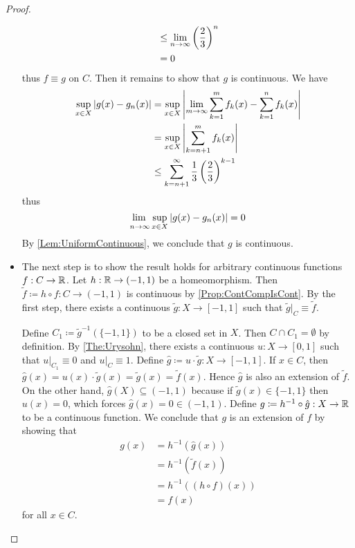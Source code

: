 \documentclass[screen]{techreport}
\numberwithin{equation}{section}
\begin{document}
\begin{proof}
\begin{itemize}
\begin{align*}
			& \le \lim_{n \to \infty} \left({\frac{2}{3}}\right)^n \\
			& = 0
		\end{align*}
		thus $f \equiv g$ on $C$.
		Then it remains to show that $g$ is continuous.
		We have
		\begin{align*}
			\sup_{x \in X} \left|{ g(x) - g_n(x) }\right| & = \sup_{x \in X} \left|{ \lim_{m \to \infty} \sum_{k=1}^m f_k(x) - \sum_{k=1}^n f_k(x) }\right| \\
			& = \sup_{x \in X} \left|{ \sum_{k=n+1}^m f_k(x) }\right| \\
			& \le \sum_{k=n+1}^\infty \frac{1}{3} \left({\frac{2}{3}}\right)^{k-1}
		\end{align*}
		thus
		\[
		\adjustlimits \lim_{n \to \infty} \sup_{x \in X} \abs{g(x) - g_n(x)} = 0
		\]
		By \cref{Lem:UniformContinuous}, we conclude that $g$ is continuous.
		
		\item The next step is to show the result holds for arbitrary continuous functions $f : C \to \mathbb{R}$.
		Let $h : \mathbb{R} \to (-1,1)$ be a homeomorphism.
		Then $\tilde{f} \coloneqq h \circ f : C \to (-1,1)$ is continuous by \cref{Prop:ContCompIsCont}.
		By the first step, there exists a continuous $\tilde{g} : X \to [-1,1]$ such that $\tilde{g}|_C \equiv \tilde{f}$.
		
		Define $C_1 \coloneqq \tilde{g}^{-1}(\{-1,1\})$ to be a closed set in $X$.
		Then $C \cap C_1 = \emptyset$ by definition.
		By \cref{The:Urysohn}, there exists a continuous $u : X \to [0,1]$ such that $u|_{C_1} \equiv 0$ and $u|_C \equiv 1$.
		Define $\hat{g} \coloneqq u \cdot \tilde{g} : X \to [-1,1]$.
		If $x \in C$, then $\hat{g}(x) = u(x) \cdot \tilde{g}(x) = \tilde{g}(x) = \tilde{f}(x)$.
		Hence $\hat{g}$ is also an extension of $\tilde{f}$.
		On the other hand, $\hat{g}(X) \subseteq (-1,1)$ because if $\tilde{g}(x) \in \{-1,1\}$ then $u(x) = 0$, which forces $\hat{g}(x) = 0 \in (-1,1)$.
		Define $g \coloneqq h^{-1} \circ \hat{g} : X \to \mathbb{R}$ to be a continuous function.
		We conclude that $g$ is an extension of $f$ by showing that
		\begin{align*}
			g(x) & = h^{-1}(\hat{g}(x)) \\
			& = h^{-1}(\tilde{f}(x)) \\
			& = h^{-1}((h \circ f)(x)) \\
			& = f(x)
		\end{align*}
		for all $x \in C$.
	\end{itemize}
\end{proof}
\end{document}
